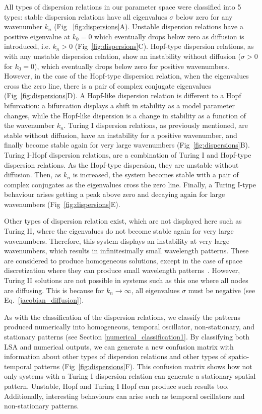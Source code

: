 All types of dispersion relations in our parameter space were classified into 5 types: stable dispersion relations have all eigenvalues $\sigma$ below zero for any wavenumber $k_{n}$ (Fig ~\ref{fig:dispersions}A). Unstable dispersion relations have a positive eigenvalue at $k_{0}=0$ which eventually drops below zero as diffusion is introduced, i.e. $k_{n}>0$ (Fig~\ref{fig:dispersions}C). Hopf-type dispersion relations, as with any unstable dispersion relation, show an instability without diffusion ($\sigma>0$ for $k_{0}=0$), which eventually drops below zero for positive wavenumbers. However, in the case of the Hopf-type dispersion relation, when the eigenvalues cross the zero line, there is a pair of complex conjugate eigenvalues (Fig~\ref{fig:dispersions}D).
A Hopf-like dispersion relation is different to a Hopf bifurcation: a bifurcation displays a shift in stability as a model parameter changes, while the Hopf-like dispersion is a change in stability as a function of the wavenumber $k_{n}$.
Turing I dispersion relations, as previously mentioned, are stable without diffusion, have an instability for a positive wavenumber, and finally become stable again for very large wavenumbers (Fig~\ref{fig:dispersions}B).
Turing I-Hopf dispersion relations, are a combination of Turing I and Hopf-type dispersion relations. As the Hopf-type dispersion, they are unstable without diffusion. Then, as $k_{n}$ is increased, the system becomes stable with a pair of complex conjugates as the eigenvalues cross the zero line.
Finally, a Turing I-type behaviour arises getting a peak above zero and decaying again for large wavenumbers (Fig~\ref{fig:dispersions}E).

Other types of dispersion relation exist, which are not displayed here such as Turing II, where the eigenvalues do not become stable again for very large wavenumbers.
Therefore, this system displays an instability at very large wavenumbers, which results in infinitesimally small wavelength patterns.
These are considered to produce homogeneous solutions, except in the case of space discretization where they can produce small wavelength patterns~\parencite{Wang2022}.
However, Turing II solutions are not possible in systems such as this one where all nodes are diffusing.
This is because for $k_n \rightarrow \infty$, all eigenvalues $\sigma$ must be negative (see Eq.~\ref{jacobian_diffusion}).

As with the classification of the dispersion relations, we classify the patterns produced numerically into homogeneous, temporal oscillator, non-stationary, and stationary patterns (see Section \ref{numerical_classification1}.
By classifying both LSA and numerical outputs, we can generate a new confusion matrix with information about other types of dispersion relations and other types of spatio-temporal patterns (Fig~\ref{fig:dispersions}F). This confusion matrix shows how not only systems with a Turing I dispersion relation can generate a stationary spatial pattern. Unstable, Hopf and Turing I Hopf can produce such results too. Additionally, interesting behaviours can arise such as temporal oscillators and non-stationary patterns.


